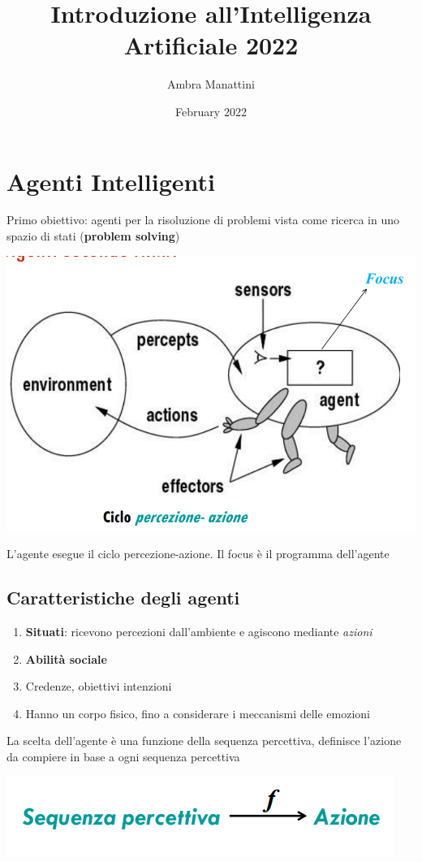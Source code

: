 \documentclass{article}
\title{Introduzione all'Intelligenza Artificiale 2022}
\author{Ambra Manattini}
\date{February 2022}
\begin{document}
\maketitle

\section{Agenti Intelligenti}
Primo obiettivo: agenti per la risoluzione di problemi vista come ricerca in uno spazio di stati (\textbf{problem solving})

\includegraphics[width=\linewidth]{1.png}

L'agente esegue il ciclo percezione-azione. Il focus è il programma dell'agente

\subsection{Caratteristiche degli agenti}
\begin{enumerate}
    \item \textbf{Situati}: ricevono percezioni dall'ambiente e agiscono mediante \textit{azioni}
    \item \textbf{Abilità sociale}
    \item Credenze, obiettivi intenzioni
    \item Hanno un corpo fisico, fino a considerare i meccanismi delle emozioni
\end{enumerate}

La scelta dell'agente è una funzione della sequenza percettiva, definisce l'azione da compiere in base a ogni sequenza percettiva

\includegraphics[]{2.png}
\end{document}
